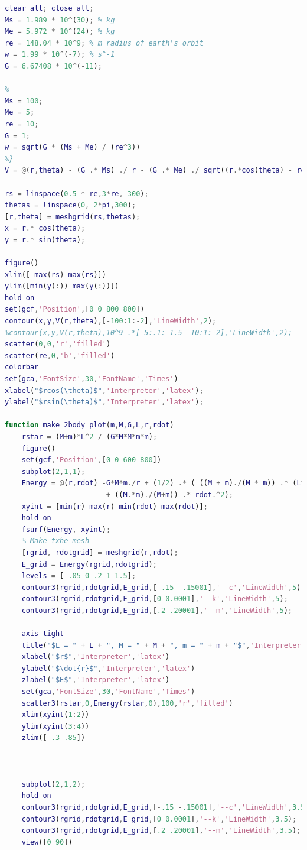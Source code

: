 \documentclass[11pt]{article}
\begin{document}
\begin{lstlisting}[language=Matlab]
%% Three Body Problem Contour Plot
clear all; close all;
Ms = 1.989 * 10^(30); % kg
Me = 5.972 * 10^(24); % kg
re = 148.04 * 10^9; % m radius of earth's orbit
w = 1.99 * 10^(-7); % s^-1
G = 6.67408 * 10^(-11);

%
Ms = 100;
Me = 5;
re = 10;
G = 1;
w = sqrt(G * (Ms + Me) / (re^3))
%}
V = @(r,theta) - (G .* Ms) ./ r - (G .* Me) ./ sqrt((r.*cos(theta) - re).^2 + (r.*sin(theta)).^2) - ((r.^2) .* (w.^2) ./ 2);

rs = linspace(0.5 * re,3*re, 300);
thetas = linspace(0, 2*pi,300); 
[r,theta] = meshgrid(rs,thetas);
x = r.* cos(theta);
y = r.* sin(theta);

figure()
xlim([-max(rs) max(rs)])
ylim([min(y(:)) max(y(:))])
hold on
set(gcf,'Position',[0 0 800 800])
contour(x,y,V(r,theta),[-100:1:-2],'LineWidth',2);
%contour(x,y,V(r,theta),10^9 .*[-5:.1:-1.5 -10:1:-2],'LineWidth',2);
scatter(0,0,'r','filled')
scatter(re,0,'b','filled')
colorbar
set(gca,'FontSize',30,'FontName','Times')
xlabel("$rcos(\theta)$",'Interpreter','latex');
ylabel("$rsin(\theta)$",'Interpreter','latex');

function make_2body_plot(m,M,G,L,r,rdot)
    rstar = (M+m)*L^2 / (G*M*M*m*m);
    figure()
    set(gcf,'Position',[0 0 600 800])
    subplot(2,1,1);
    Energy = @(r,rdot) -G*M*m./r + (1/2) .* ( ((M + m)./(M * m)) .* (L^2 ./ r.^2) ...
                        + ((M.*m)./(M+m)) .* rdot.^2);
    xyint = [min(r) max(r) min(rdot) max(rdot)];
    hold on
    fsurf(Energy, xyint);
    % Make txhe mesh
    [rgrid, rdotgrid] = meshgrid(r,rdot);
    E_grid = Energy(rgrid,rdotgrid);
    levels = [-.05 0 .2 1 1.5];
    contour3(rgrid,rdotgrid,E_grid,[-.15 -.15001],'--c','LineWidth',5);
    contour3(rgrid,rdotgrid,E_grid,[0 0.0001],'--k','LineWidth',5);
    contour3(rgrid,rdotgrid,E_grid,[.2 .20001],'--m','LineWidth',5);

    axis tight
    title("$L = " + L + ", M = " + M + ", m = " + m + "$",'Interpreter','latex')
    xlabel("$r$",'Interpreter','latex')
    ylabel("$\dot{r}$",'Interpreter','latex')
    zlabel("$E$",'Interpreter','latex')
    set(gca,'FontSize',30,'FontName','Times')
    scatter3(rstar,0,Energy(rstar,0),100,'r','filled')
    xlim(xyint(1:2))
    ylim(xyint(3:4))
    zlim([-.3 .85])



    subplot(2,1,2);
    hold on
    contour3(rgrid,rdotgrid,E_grid,[-.15 -.15001],'--c','LineWidth',3.5);
    contour3(rgrid,rdotgrid,E_grid,[0 0.0001],'--k','LineWidth',3.5);
    contour3(rgrid,rdotgrid,E_grid,[.2 .20001],'--m','LineWidth',3.5);
    view([0 90])


\end{lstlisting}
\end{document}

